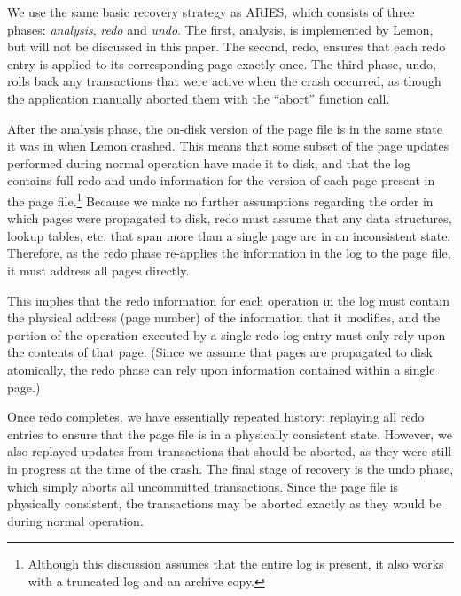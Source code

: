 \documentclass[letterpaper,twocolumn,english]{article}
\newcommand{\yad}{Lemon\xspace}
\begin{document}
%

We use the same basic recovery strategy as ARIES, which consists of
three phases: {\em analysis}, {\em redo} and {\em undo}.  The first,
analysis, is implemented by \yad, but will not be discussed in this
paper. The second, redo, ensures that each redo entry is applied to
its corresponding page exactly once.  The third phase, undo, rolls
back any transactions that were active when the crash occurred, as
though the application manually aborted them with the ``abort''
function call.
  
After the analysis phase, the on-disk version of the page file is in
the same state it was in when \yad crashed. This means that some
subset of the page updates performed during normal operation have made
it to disk, and that the log contains full redo and undo information
for the version of each page present in the page
file.\footnote{Although this discussion assumes that the entire log is
present, it also works with a truncated log and an archive copy.}
Because we make no further assumptions regarding the order in which
pages were propagated to disk, redo must assume that any data
structures, lookup tables, etc. that span more than a single page are
in an inconsistent state. Therefore, as the redo phase re-applies the
information in the log to the page file, it must address all pages
directly.

This implies that the redo information for each operation in the log
must contain the physical address (page number) of the information
that it modifies, and the portion of the operation executed by a
single redo log entry must only rely upon the contents of that
page. (Since we assume that pages are propagated to disk atomically,
the redo phase can rely upon information contained within a single
page.)

Once redo completes, we have essentially repeated history: replaying
all redo entries to ensure that the page file is in a physically
consistent state.  However, we also replayed updates from transactions
that should be aborted, as they were still in progress at the time of
the crash.  The final stage of recovery is the undo phase, which simply
aborts all uncommitted transactions. Since the page file is physically
consistent, the transactions may be aborted exactly as they would be
during normal operation.
\end{document}
